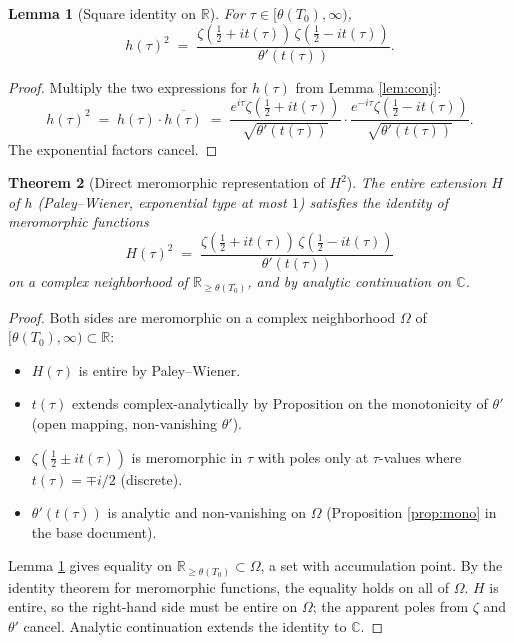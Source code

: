 \documentclass[11pt]{article}
\newtheorem{theorem}{Theorem}
\newtheorem{lemma}[theorem]{Lemma}
\theoremstyle{definition}
\begin{document}
\begin{lemma}[Square identity on $\mathbb{R}$]\label{lem:square}
For $\tau \in [\theta(T_0), \infty)$,
\[
h(\tau)^2 \;=\; \frac{\zeta(\tfrac12 + it(\tau))\,\zeta(\tfrac12 - it(\tau))}{\theta'(t(\tau))}.
\]
\end{lemma}

\begin{proof}
Multiply the two expressions for $h(\tau)$ from Lemma \ref{lem:conj}:
\[
h(\tau)^2 \;=\; h(\tau)\cdot\overline{h(\tau)} \;=\; \frac{e^{i\tau}\zeta(\tfrac12+it(\tau))}{\sqrt{\theta'(t(\tau))}} \cdot \frac{e^{-i\tau}\zeta(\tfrac12-it(\tau))}{\sqrt{\theta'(t(\tau))}}.
\]
The exponential factors cancel.
\end{proof}

\begin{theorem}[Direct meromorphic representation of $H^2$]\label{thm:H2}
The entire extension $H$ of $h$ (Paley--Wiener, exponential type at most $1$) satisfies the identity of meromorphic functions
\[
H(\tau)^2 \;=\; \frac{\zeta(\tfrac12 + it(\tau))\,\zeta(\tfrac12 - it(\tau))}{\theta'(t(\tau))}
\]
on a complex neighborhood of $\mathbb{R}_{\ge\theta(T_0)}$, and by analytic continuation on $\mathbb{C}$.
\end{theorem}

\begin{proof}
Both sides are meromorphic on a complex neighborhood $\Omega$ of $[\theta(T_0), \infty) \subset \mathbb{R}$:
\begin{itemize}
\item $H(\tau)$ is entire by Paley--Wiener.
\item $t(\tau)$ extends complex-analytically by Proposition on the monotonicity of $\theta'$ (open mapping, non-vanishing $\theta'$).
\item $\zeta(\tfrac12 \pm it(\tau))$ is meromorphic in $\tau$ with poles only at $\tau$-values where $t(\tau) = \mp i/2$ (discrete).
\item $\theta'(t(\tau))$ is analytic and non-vanishing on $\Omega$ (Proposition \ref{prop:mono} in the base document).
\end{itemize}
Lemma \ref{lem:square} gives equality on $\mathbb{R}_{\ge \theta(T_0)} \subset \Omega$, a set with accumulation point. By the identity theorem for meromorphic functions, the equality holds on all of $\Omega$. $H$ is entire, so the right-hand side must be entire on $\Omega$; the apparent poles from $\zeta$ and $\theta'$ cancel. Analytic continuation extends the identity to $\mathbb{C}$.
\end{proof}
\end{document}
